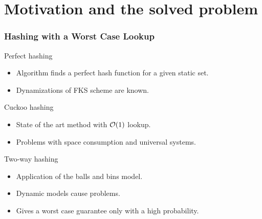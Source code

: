 \section{Motivation and the solved problem}

\begin{frame}
	\frametitle{Hashing with a Worst Case Lookup}
	
	\begin{block}{Perfect hashing}
		\begin{itemize}
			\item Algorithm finds a perfect hash function for a given static set.
			\item Dynamizations of FKS scheme are known.
		\end{itemize}
	\end{block}
	
	\begin{block}{Cuckoo hashing}
		\begin{itemize}
			\item State of the art method with $\mathcal{O}(1)$ lookup.
			\item Problems with space consumption and universal systems.
		\end{itemize}
	\end{block}
	
	\begin{block}{Two-way hashing}
		\begin{itemize}
			\item Application of the balls and bins model.
			\item Dynamic models cause problems.
			\item Gives a worst case guarantee only with a high probability.
		\end{itemize}
	\end{block}
\end{frame}

